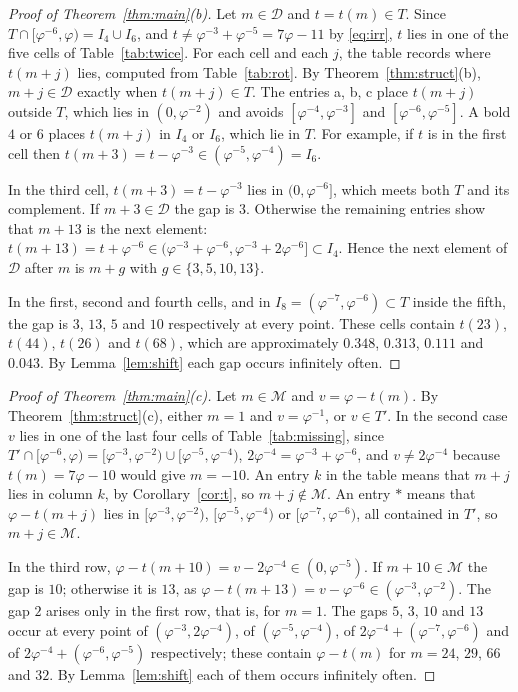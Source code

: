 \documentclass[12pt]{article}
\newcommand{\D}{\mathcal{D}}
\newcommand{\M}{\mathcal{M}}
\theoremstyle{plain}
\theoremstyle{remark}
\begin{document}
\begin{proof}[Proof of Theorem~\ref{thm:main}(b)]
Let $m\in\D$ and $t=t(m)\in T$. Since $T\cap[\varphi^{-6},\varphi)=I_4\cup I_6$, and
$t\ne\varphi^{-3}+\varphi^{-5}=7\varphi-11$ by \eqref{eq:irr}, $t$ lies in one of the five cells
of Table~\ref{tab:twice}. For each cell and each $j$, the table records where $t(m+j)$ lies,
computed from Table~\ref{tab:rot}. By Theorem~\ref{thm:struct}(b), $m+j\in\D$ exactly when
$t(m+j)\in T$. The entries a, b, c place $t(m+j)$ outside $T$, which lies in $(0,\varphi^{-2})$
and avoids $[\varphi^{-4},\varphi^{-3}]$ and $[\varphi^{-6},\varphi^{-5}]$. A bold $4$ or $6$
places $t(m+j)$ in $I_4$ or $I_6$, which lie in $T$. For example, if $t$ is in the first cell then
$t(m+3)=t-\varphi^{-3}\in(\varphi^{-5},\varphi^{-4})=I_6$.

In the third cell, $t(m+3)=t-\varphi^{-3}$ lies in $(0,\varphi^{-6}]$, which meets both $T$ and its
complement. If $m+3\in\D$ the gap is $3$. Otherwise the remaining entries show that $m+13$ is the
next element: $t(m+13)=t+\varphi^{-6}\in(\varphi^{-3}+\varphi^{-6},\varphi^{-3}+2\varphi^{-6}]\subset I_4$.
Hence the next element of $\D$ after $m$ is $m+g$ with $g\in\{3,5,10,13\}$.

In the first, second and fourth cells, and in $I_8=(\varphi^{-7},\varphi^{-6})\subset T$ inside the
fifth, the gap is $3$, $13$, $5$ and $10$ respectively at every point. These cells contain $t(23)$,
$t(44)$, $t(26)$ and $t(68)$, which are approximately $0.348$, $0.313$, $0.111$ and $0.043$. By
Lemma~\ref{lem:shift} each gap occurs infinitely often.
\end{proof}

\begin{proof}[Proof of Theorem~\ref{thm:main}(c)]
Let $m\in\M$ and $v=\varphi-t(m)$. By Theorem~\ref{thm:struct}(c), either $m=1$ and
$v=\varphi^{-1}$, or $v\in T'$. In the second case $v$ lies in one of the last four cells of
Table~\ref{tab:missing}, since $T'\cap[\varphi^{-6},\varphi)=[\varphi^{-3},\varphi^{-2})\cup
[\varphi^{-5},\varphi^{-4})$, $2\varphi^{-4}=\varphi^{-3}+\varphi^{-6}$, and
$v\ne2\varphi^{-4}$ because $t(m)=7\varphi-10$ would give $m=-10$. An entry $k$ in the table means
that $m+j$ lies in column $k$, by Corollary~\ref{cor:t}, so $m+j\notin\M$. An entry $\ast$ means
that $\varphi-t(m+j)$ lies in $[\varphi^{-3},\varphi^{-2})$, $[\varphi^{-5},\varphi^{-4})$ or
$[\varphi^{-7},\varphi^{-6})$, all contained in $T'$, so $m+j\in\M$.

In the third row, $\varphi-t(m+10)=v-2\varphi^{-4}\in(0,\varphi^{-5})$. If $m+10\in\M$ the gap is
$10$; otherwise it is $13$, as $\varphi-t(m+13)=v-\varphi^{-6}\in(\varphi^{-3},\varphi^{-2})$.
The gap $2$ arises only in the first row, that is, for $m=1$. The gaps $5$, $3$, $10$ and $13$
occur at every point of $(\varphi^{-3},2\varphi^{-4})$, of $(\varphi^{-5},\varphi^{-4})$, of
$2\varphi^{-4}+(\varphi^{-7},\varphi^{-6})$ and of $2\varphi^{-4}+(\varphi^{-6},\varphi^{-5})$
respectively; these contain $\varphi-t(m)$ for $m=24$, $29$, $66$ and $32$. By
Lemma~\ref{lem:shift} each of them occurs infinitely often.
\end{proof}
\end{document}

